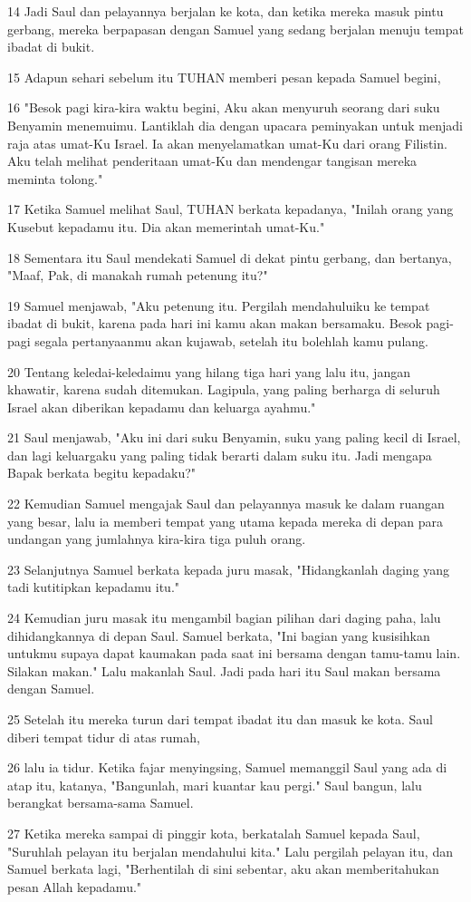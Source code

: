 \par 14 Jadi Saul dan pelayannya berjalan ke kota, dan ketika mereka masuk pintu gerbang, mereka berpapasan dengan Samuel yang sedang berjalan menuju tempat ibadat di bukit.
\par 15 Adapun sehari sebelum itu TUHAN memberi pesan kepada Samuel begini,
\par 16 "Besok pagi kira-kira waktu begini, Aku akan menyuruh seorang dari suku Benyamin menemuimu. Lantiklah dia dengan upacara peminyakan untuk menjadi raja atas umat-Ku Israel. Ia akan menyelamatkan umat-Ku dari orang Filistin. Aku telah melihat penderitaan umat-Ku dan mendengar tangisan mereka meminta tolong."
\par 17 Ketika Samuel melihat Saul, TUHAN berkata kepadanya, "Inilah orang yang Kusebut kepadamu itu. Dia akan memerintah umat-Ku."
\par 18 Sementara itu Saul mendekati Samuel di dekat pintu gerbang, dan bertanya, "Maaf, Pak, di manakah rumah petenung itu?"
\par 19 Samuel menjawab, "Aku petenung itu. Pergilah mendahuluiku ke tempat ibadat di bukit, karena pada hari ini kamu akan makan bersamaku. Besok pagi-pagi segala pertanyaanmu akan kujawab, setelah itu bolehlah kamu pulang.
\par 20 Tentang keledai-keledaimu yang hilang tiga hari yang lalu itu, jangan khawatir, karena sudah ditemukan. Lagipula, yang paling berharga di seluruh Israel akan diberikan kepadamu dan keluarga ayahmu."
\par 21 Saul menjawab, "Aku ini dari suku Benyamin, suku yang paling kecil di Israel, dan lagi keluargaku yang paling tidak berarti dalam suku itu. Jadi mengapa Bapak berkata begitu kepadaku?"
\par 22 Kemudian Samuel mengajak Saul dan pelayannya masuk ke dalam ruangan yang besar, lalu ia memberi tempat yang utama kepada mereka di depan para undangan yang jumlahnya kira-kira tiga puluh orang.
\par 23 Selanjutnya Samuel berkata kepada juru masak, "Hidangkanlah daging yang tadi kutitipkan kepadamu itu."
\par 24 Kemudian juru masak itu mengambil bagian pilihan dari daging paha, lalu dihidangkannya di depan Saul. Samuel berkata, "Ini bagian yang kusisihkan untukmu supaya dapat kaumakan pada saat ini bersama dengan tamu-tamu lain. Silakan makan." Lalu makanlah Saul. Jadi pada hari itu Saul makan bersama dengan Samuel.
\par 25 Setelah itu mereka turun dari tempat ibadat itu dan masuk ke kota. Saul diberi tempat tidur di atas rumah,
\par 26 lalu ia tidur. Ketika fajar menyingsing, Samuel memanggil Saul yang ada di atap itu, katanya, "Bangunlah, mari kuantar kau pergi." Saul bangun, lalu berangkat bersama-sama Samuel.
\par 27 Ketika mereka sampai di pinggir kota, berkatalah Samuel kepada Saul, "Suruhlah pelayan itu berjalan mendahului kita." Lalu pergilah pelayan itu, dan Samuel berkata lagi, "Berhentilah di sini sebentar, aku akan memberitahukan pesan Allah kepadamu."

